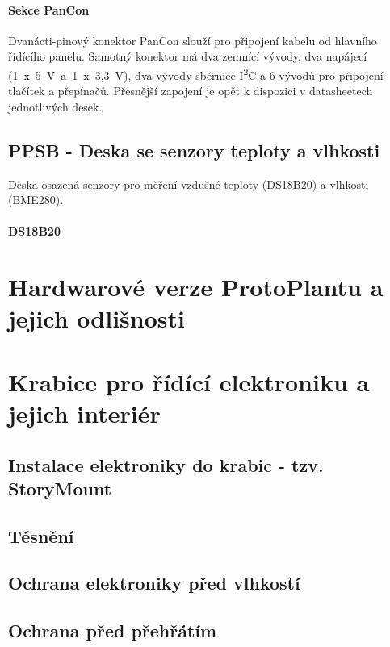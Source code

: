\paragraph{Sekce PanCon}
Dvanácti-pinový konektor PanCon slouží pro připojení kabelu od hlavního řídícího panelu. 
Samotný konektor má dva zemnící vývody, dva napájecí (1~x~5~V~a~1~x~3,3~V), dva vývody sběrnice I\textsuperscript{2}C a 6 vývodů pro připojení tlačítek a přepínačů.
Přesnější zapojení je opět k dispozici v datasheetech jednotlivých desek.

\subsection{PPSB - Deska se senzory teploty a vlhkosti}
Deska osazená senzory pro měření vzdušné teploty (DS18B20) a vlhkosti (BME280). 

\paragraph{DS18B20}

\section{Hardwarové verze ProtoPlantu a jejich odlišnosti}

\section{Krabice pro řídící elektroniku a jejich interiér}

\subsection{Instalace elektroniky do krabic - tzv. StoryMount}

\subsection{Těsnění}

\subsection{Ochrana elektroniky před vlhkostí}

\subsection{Ochrana před přehřátím}

\newpage